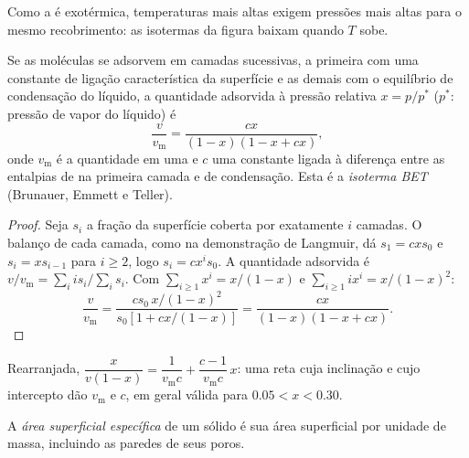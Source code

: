 Como a  é exotérmica, temperaturas mais altas exigem pressões mais altas
para o mesmo recobrimento: as isotermas da figura baixam quando $T$ sobe.

\begin{theorem}\label{thm:b3:surfaces-catalysis:bet}
Se as moléculas se adsorvem em camadas sucessivas, a primeira com uma constante de
ligação característica da superfície e as demais com o equilíbrio de condensação
do líquido, a quantidade adsorvida à pressão relativa $x = p/p^*$ ($p^*$: pressão de
vapor do  líquido) é
\[
  \frac{v}{v_{\mathrm m}} = \frac{cx}{(1 - x)(1 - x + cx)},
\]
onde $v_{\mathrm m}$ é a quantidade em uma  e $c$ uma constante ligada à
diferença entre as entalpias de  na primeira camada e de condensação.
Esta é a \emph{isoterma BET} (Brunauer, Emmett e Teller).
\end{theorem}

\begin{proof}
Seja $s_i$ a fração da superfície coberta por exatamente $i$ camadas. O balanço de
cada camada, como na demonstração de Langmuir, dá $s_1 = cxs_0$ e $s_i =
xs_{i-1}$ para $i \ge 2$, logo $s_i = cx^is_0$. A quantidade adsorvida é $v/v_{\mathrm m} =
\sum_iis_i/\sum_is_i$. Com $\sum_{i\ge1}x^i = x/(1 - x)$ e $\sum_{i\ge1}ix^i = x/(1 - x)^2$:
\[
  \frac{v}{v_{\mathrm m}} = \frac{cs_0\,x/(1 - x)^2}{s_0[1 + cx/(1 - x)]} = \frac{cx}{(1 - x)(1 - x + cx)} .
\]
\end{proof}

Rearranjada, $\dfrac{x}{v(1 - x)} = \dfrac{1}{v_{\mathrm m}c} + \dfrac{c - 1}{v_{\mathrm m}c}\,x$: uma reta cuja inclinação e
cujo intercepto dão $v_{\mathrm m}$ e $c$, em geral válida para $0.05 < x < 0.30$.

\begin{definition}\label{def:b3:surfaces-catalysis:surface-area}
A \emph{área superficial específica} de um sólido é sua
área superficial por unidade de massa, incluindo as paredes de seus poros.
\end{definition}

